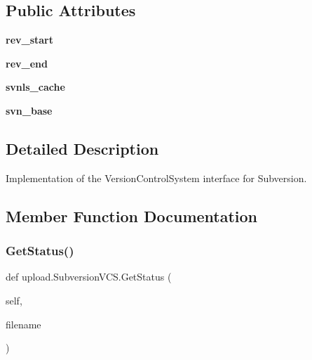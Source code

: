 \subsection*{Public Attributes}
\begin{DoxyCompactItemize}
\item 
\mbox{\label{classupload_1_1_subversion_v_c_s_ad1553a69f4a790309273dbdeb9077732}} 
{\bfseries rev\+\_\+start}
\item 
\mbox{\label{classupload_1_1_subversion_v_c_s_ac0bb07a099c722b7f8622de4b225904f}} 
{\bfseries rev\+\_\+end}
\item 
\mbox{\label{classupload_1_1_subversion_v_c_s_aa801782f807674b06f491df5d7ca9942}} 
{\bfseries svnls\+\_\+cache}
\item 
\mbox{\label{classupload_1_1_subversion_v_c_s_a60645c40d2fea4cd52881576bd13341f}} 
{\bfseries svn\+\_\+base}
\end{DoxyCompactItemize}


\subsection{Detailed Description}
\begin{DoxyVerb}Implementation of the VersionControlSystem interface for Subversion.\end{DoxyVerb}
 

\subsection{Member Function Documentation}
\mbox{\label{classupload_1_1_subversion_v_c_s_ac3785eb1fa561088206d01570f9fe982}} 
\subsubsection{\texorpdfstring{Get\+Status()}{GetStatus()}}
{\footnotesize\ttfamily def upload.\+Subversion\+V\+C\+S.\+Get\+Status (\begin{DoxyParamCaption}\item[{}]{self,  }\item[{}]{filename }\end{DoxyParamCaption})}

